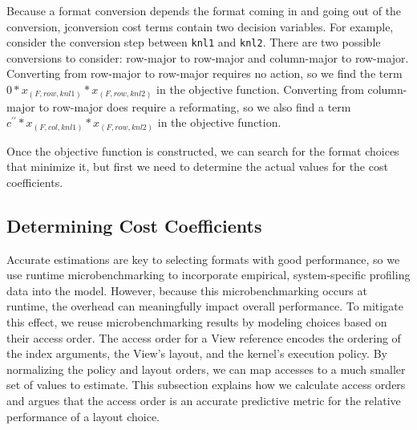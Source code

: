 \documentclass[sigconf,review=true]{acmart}
\begin{document}
Because a format conversion depends the format coming in and going out of the conversion, jconversion cost terms contain two decision variables.
For example, consider the conversion step between \verb.knl1. and \verb.knl2..
There are two possible conversions to consider: row-major to row-major and column-major to row-major. 
Converting from row-major to row-major requires no action, so we  find the term $0 * x_{(F,row,knl1)} * x_{(F,row,knl2)}$ in the objective function.
Converting from column-major to row-major does require a reformating, so we  also find a term $c^{\prime\prime} * x_{(F,col,knl1)} * x_{(F,row,knl2)}$ in the objective function.

Once the objective function is constructed, we can search for the format choices that minimize it, but first we need to determine the actual values for the cost coefficients.

\subsection{Determining Cost Coefficients}

Accurate estimations are key to selecting formats with good performance, so we use runtime microbenchmarking to incorporate empirical, system-specific profiling data into the model.
However, because this microbenchmarking occurs at runtime, the overhead can meaningfully impact overall performance. 
To mitigate this effect, we reuse microbenchmarking results by modeling choices based on their access order.
The access order for a View reference encodes the ordering of the index arguments, the View's layout, and the kernel's execution policy.
By normalizing the policy and layout orders, we can map accesses to a much smaller set of values to estimate.
This subsection explains how we calculate access orders and argues that the access order is an accurate predictive metric for the relative performance of a layout choice. 
\end{document}
